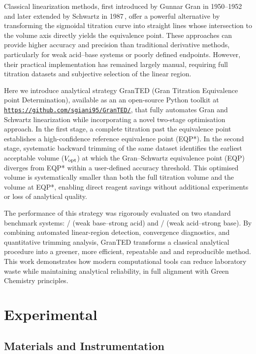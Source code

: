 \documentclass[twoside,twocolumn,9pt]{article}
\begin{document}
Classical linearization methods, first introduced by Gunnar Gran in 1950--1952\,\cite{Gran1950,Gran1952} and later extended by Schwartz in 1987\,\cite{Schwartz1987}, offer a powerful alternative by transforming the sigmoidal titration curve into straight lines whose intersection to the volume axis directly yields the equivalence point.
These approaches can provide higher accuracy and precision than traditional derivative methods, particularly for weak acid--base systems or poorly defined endpoints.
However, their practical implementation has remained largely manual, requiring full titration datasets and subjective selection of the linear region.

Here we introduce analytical strategy \textsf{GranTED} (Gran Titration Equivalence point Determination), available as an an open-source Python toolkit at \href{https://github.com/sgiani95/GranTED/}{\texttt{https://github.com/sgiani95/GranTED/}}, that fully automates Gran and Schwartz linearization while incorporating a novel two-stage optimisation approach.
In the first stage, a complete titration past the equivalence point establishes a high-confidence reference equivalence point (EQP*).
In the second stage, systematic backward trimming of the same dataset identifies the earliest acceptable volume (\(V_{\rm opt}\)) at which the Gran--Schwartz equivalence point (EQP) diverges from EQP* within a user-defined accuracy threshold.
This optimised volume is systematically smaller than both the full titration volume and the volume at EQP*, enabling direct reagent savings without additional experiments or loss of analytical quality.

The performance of this strategy was rigorously evaluated on two standard benchmark systems: / (weak base--strong acid) and / (weak acid--strong base). By combining automated linear-region detection, convergence diagnostics, and quantitative trimming analysis, \textsf{GranTED} transforms a classical analytical procedure into a greener, more efficient, repeatable and and reproducible method.
This work demonstrates how modern computational tools can reduce laboratory waste while maintaining analytical reliability, in full alignment with Green Chemistry principles.

\section*{Experimental}

\subsection*{Materials and Instrumentation}
\end{document}
